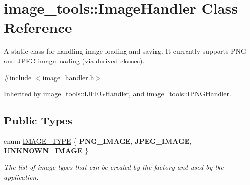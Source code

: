 \hypertarget{classimage__tools_1_1ImageHandler}{}\section{image\+\_\+tools\+:\+:Image\+Handler Class Reference}
\label{classimage__tools_1_1ImageHandler}


A static class for handling image loading and saving. It currently supports P\+NG and J\+P\+EG image loading (via derived classes).  




{\ttfamily \#include $<$image\+\_\+handler.\+h$>$}



Inherited by \hyperlink{classimage__tools_1_1IJPEGHandler}{image\+\_\+tools\+::\+I\+J\+P\+E\+G\+Handler}, and \hyperlink{classimage__tools_1_1IPNGHandler}{image\+\_\+tools\+::\+I\+P\+N\+G\+Handler}.

\subsection*{Public Types}
\begin{DoxyCompactItemize}
\item 
enum \hyperlink{classimage__tools_1_1ImageHandler_a1ad849e8783b00364ed9353861540868}{I\+M\+A\+G\+E\+\_\+\+T\+Y\+PE} \{ {\bfseries P\+N\+G\+\_\+\+I\+M\+A\+GE}, 
{\bfseries J\+P\+E\+G\+\_\+\+I\+M\+A\+GE}, 
{\bfseries U\+N\+K\+N\+O\+W\+N\+\_\+\+I\+M\+A\+GE}
 \}\hypertarget{classimage__tools_1_1ImageHandler_a1ad849e8783b00364ed9353861540868}{}\label{classimage__tools_1_1ImageHandler_a1ad849e8783b00364ed9353861540868}
\begin{DoxyCompactList}\small\item\em The list of image types that can be created by the factory and used by the application. \end{DoxyCompactList}
\end{DoxyCompactItemize}

